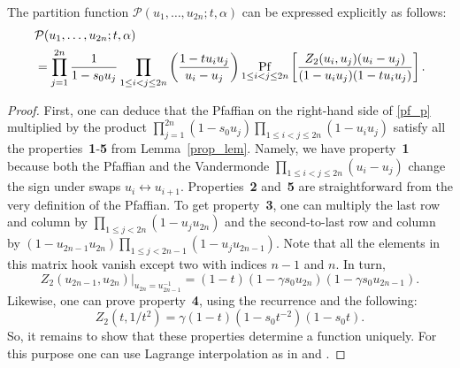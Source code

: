 \documentclass[ALCO,Unicode]{cedram}
\newcommand{\pf}{\mathop{\rm Pf}}
\begin{document}
\begin{theorem} \label{pf_thm}
	The partition function $\mathcal{P} (u_1, \dots, u_{2n}; t, \alpha)$ can be expressed explicitly as follows:
	\begin{equation}
	\begin{split}
	&
	\label{pf_p}
	\mathcal{P} (u_1, \dots, u_{2n}; t, \alpha) \\&
	= 	\prod_{j = 1}^{2n} \frac{1}{1 - s_0 u_j} \prod_{1 \leq i<j \leq 2n}
	\left(
	\frac{1-t u_i u_j}{u_i - u_j}
	\right)
	\pf_{1\leq i < j \leq 2n}
	\left[
	\frac{Z_{2}(u_i, u_j) (u_i - u_j)}
	{(1-u_i u_j) (1-t u_i u_j)}
	\right].
	\end{split}
	\end{equation}
\end{theorem}
\begin{proof}
	First, one can deduce that the Pfaffian on the right-hand side of \eqref{pf_p} multiplied by the product $\prod_{j = 1}^{2n} (1 - s_0 u_j) \prod_{1 \leq i < j \leq 2n} (1 - u_{i} u_{j}) $ satisfy all the properties~\textbf{1}-\textbf{5} from Lemma~\ref{prop_lem}. Namely, we have property~\textbf{1} because both the Pfaffian and the Vandermonde $\prod_{1 \leq i < j \leq 2n} (u_{i} - u_{j}) $ change the sign under swaps $u_i \leftrightarrow u_{i+1}$. Properties~\textbf{2} and~\textbf{5} are straightforward from the very definition of the Pfaffian. To get property~\textbf{3}, one can multiply the last row and column by $\prod_{1 \leq j < 2n} (1 - u_{j} u_{2n}) $ and the second-to-last row and column by $(1 - u_{2n-1} u_{2n})\prod_{1 \leq j < 2n-1} (1 - u_{j} u_{2n-1}) $. Note that all the elements in this matrix hook vanish except two with indices $n-1$ and $n$. In turn,
	\begin{equation*}
	Z_{2}(u_{2n-1},u_{2n})\big\vert_{u_{2n}=u_{2n-1}^{-1}}= (1-t)
	(1-\gamma s_0u_{2n})(1-\gamma s_0 u_{2n-1}).
	\end{equation*}
	Likewise, one can prove property~\textbf{4}, using the recurrence and the following: \begin{equation*}Z_{2}(t,  1 / t^2) = \gamma(1 - t)(1 - s_{0} t^{-2})(1 -s_{0} t).\end{equation*}
	So, it remains to show that these properties determine a function uniquely. For this purpose one can use Lagrange interpolation as in  \cite{Pet21} and \cite[Appendix B]{WZJ16}.
	

\end{proof}
\end{document}
